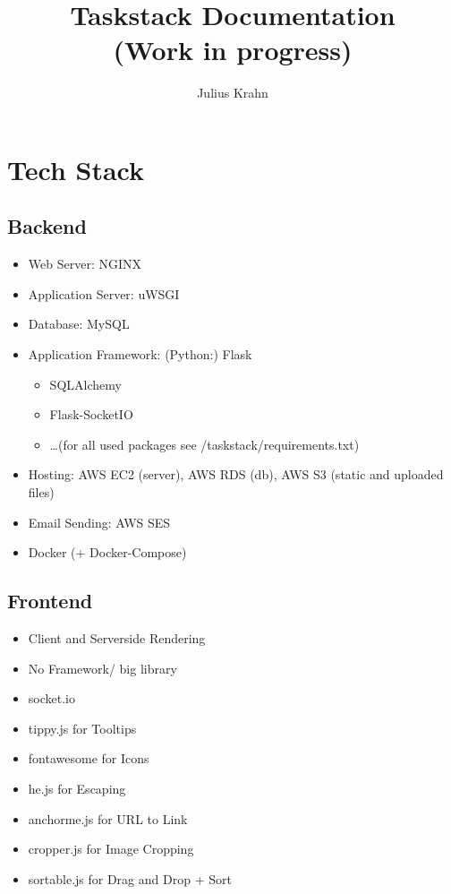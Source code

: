 \documentclass[a4paper, 12pt]{article}
\begin{document}
\title{Taskstack Documentation\\
\large (Work in progress)}
\author{Julius Krahn}
\maketitle

\tableofcontents

\newpage

\section{Tech Stack}

\subsection{Backend}

\begin{itemize}
	\item Web Server: NGINX
	\item Application Server: uWSGI
	\item Database: MySQL
    \item Application Framework: (Python:) Flask
    \begin{itemize}
        \item SQLAlchemy
        \item Flask-SocketIO
        \item \dots (for all used packages see /taskstack/requirements.txt)
    \end{itemize}
    \item Hosting: AWS EC2 (server), AWS RDS (db), AWS S3 (static and uploaded files)
    \item Email Sending: AWS SES
    \item Docker (+ Docker-Compose)
\end{itemize}

\subsection{Frontend}

\begin{itemize}
    \item Client and Serverside Rendering
	\item No Framework/ big library
	\item socket.io
	\item tippy.js for Tooltips
	\item fontawesome for Icons
	\item he.js for Escaping
	\item anchorme.js for URL to Link
	\item cropper.js for Image Cropping
	\item sortable.js for Drag and Drop + Sort
\end{itemize}
\end{document}
